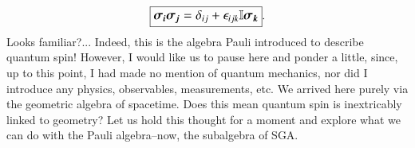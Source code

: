 \begin{equation}
    \large \boxed{ \vec{\sigma_i} \vec{\sigma_j} = \delta_{ij} +  \epsilon_{ijk} \mathbb{I} \vec{\sigma_k}  }.
\end{equation}
Looks familiar?... Indeed, this is the algebra Pauli introduced to describe quantum spin! \cite{havel_bloch-sphere-type_2004} However, I would like us to pause here and ponder a little, since, up to this point, I had made no mention of quantum mechanics, nor did I introduce any physics, observables, measurements, etc. We arrived here purely via the geometric algebra of spacetime. Does this mean quantum spin is inextricably linked to geometry? Let us hold this thought for a moment and explore what we can do with the Pauli algebra--now, the subalgebra of SGA.
